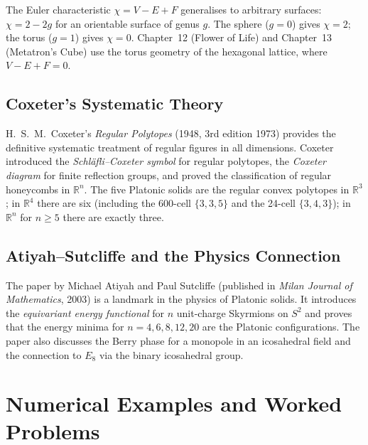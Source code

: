 The Euler characteristic $\chi = V - E + F$ generalises to arbitrary surfaces:
$\chi = 2 - 2g$ for an orientable surface of genus $g$.  The sphere ($g=0$)
gives $\chi = 2$; the torus ($g=1$) gives $\chi = 0$.  Chapter~12 (Flower of
Life) and Chapter~13 (Metatron's Cube) use the torus geometry of the
hexagonal lattice, where $V-E+F = 0$.

\subsection{Coxeter's Systematic Theory}
\label{subsec:history-coxeter}

H.~S.~M.~Coxeter's \emph{Regular Polytopes} \cite{coxeter_regular_polytopes} (1948,
3rd edition 1973) provides the definitive systematic treatment of regular
figures in all dimensions.  Coxeter introduced the \emph{Schläfli–Coxeter
symbol} for regular polytopes, the \emph{Coxeter diagram} for finite
reflection groups, and proved the classification of regular honeycombs in
$\mathbb{R}^n$.  The five Platonic solids are the regular convex polytopes in
$\mathbb{R}^3$; in $\mathbb{R}^4$ there are six (including the 600-cell
$\{3,3,5\}$ and the 24-cell $\{3,4,3\}$); in $\mathbb{R}^n$ for $n \geq 5$
there are exactly three.

\subsection{Atiyah–Sutcliffe and the Physics Connection}
\label{subsec:history-atiyah}

The paper by Michael Atiyah and Paul Sutcliffe \cite{atiyah_sutcliffe_polyhedra}
(published in \emph{Milan Journal of Mathematics}, 2003) is a landmark in the
physics of Platonic solids.  It introduces the \emph{equivariant energy
functional} for $n$ unit-charge Skyrmions on $S^2$ and proves that the energy
minima for $n = 4, 6, 8, 12, 20$ are the Platonic configurations.  The paper
also discusses the Berry phase for a monopole in an icosahedral field and the
connection to $E_8$ via the binary icosahedral group.


\section{Numerical Examples and Worked Problems}
\label{sec:worked-problems}

